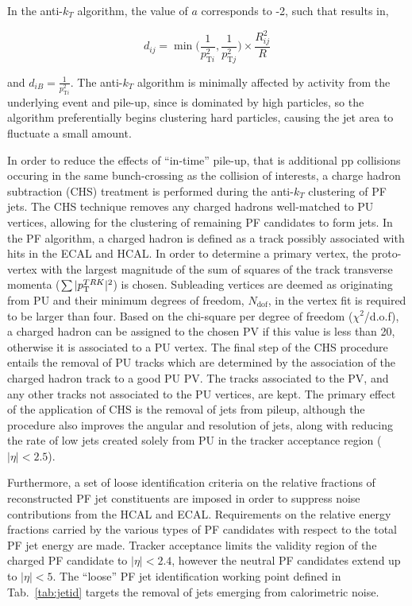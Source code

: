 In the anti-$k_{T}$ algorithm, the value of $a$ corresponds to -2, such that  results in,

\begin{equation}
  d_{ij} = \min\bigg(\frac{1}{p_{\text{T}i}^{2}},\frac{1}{p_{\text{T}j}^{2}}\bigg)\times\frac{R_{ij}^{2}}{R}
  \label{eq:antikt}
\end{equation}

and $d_{iB}=\frac{1}{p_{\text{T}i}^{2}}$. The anti-$k_{T}$ algorithm is minimally affected by activity from the underlying event and pile-up, since  is dominated by high \pt particles, so the algorithm preferentially begins clustering hard particles, causing the jet area to fluctuate a small amount.

In order to reduce the effects of ``in-time'' pile-up, that is additional pp collisions occuring in the same bunch-crossing as the collision of interests, a charge hadron subtraction (CHS) treatment is performed during the anti-$k_{T}$ clustering of PF jets. The CHS technique removes any charged hadrons well-matched to PU vertices, allowing for the clustering of remaining PF candidates to form jets. In the PF algorithm, a charged hadron is defined as a track possibly associated with hits in the ECAL and HCAL. In order to determine a primary vertex, the proto-vertex with the largest magnitude of the sum of squares of the track transverse momenta \Big($\sum{|\pt^{TRK}|^2}$\Big) is chosen. Subleading vertices are deemed as originating from PU and their minimum degrees of freedom, $N_{\mathrm{dof}}$, in the vertex fit is required to be larger than four. Based on the chi-square per degree of freedom ($\chi^2$/d.o.f), a charged hadron can be assigned to the chosen PV if this value is less than 20, otherwise it is associated to a PU vertex. The final step of the CHS procedure entails the removal of PU tracks which are determined by the association of the charged hadron track to a good PU PV. The tracks associated to the PV, and any other tracks not associated to the PU vertices, are kept. The primary effect of the application of CHS is the removal of jets from pileup, although the procedure also improves the angular and \pt resolution of jets, along with reducing the rate of low \pt jets created solely from PU in the tracker acceptance region ($|\eta|<2.5$).

Furthermore, a set of loose identification criteria on the relative fractions of reconstructed PF jet constituents are imposed in order to suppress noise contributions from the HCAL and ECAL. Requirements on the relative energy fractions carried by the various types of PF candidates with respect to the total PF jet energy are made. Tracker acceptance limits the validity region of the charged PF candidate to $|\eta|<2.4$, however the neutral PF candidates extend up to $|\eta|<5$. The ``loose'' PF jet identification working point defined in Tab.~\ref{tab:jetid} targets the removal of jets emerging from calorimetric noise.

